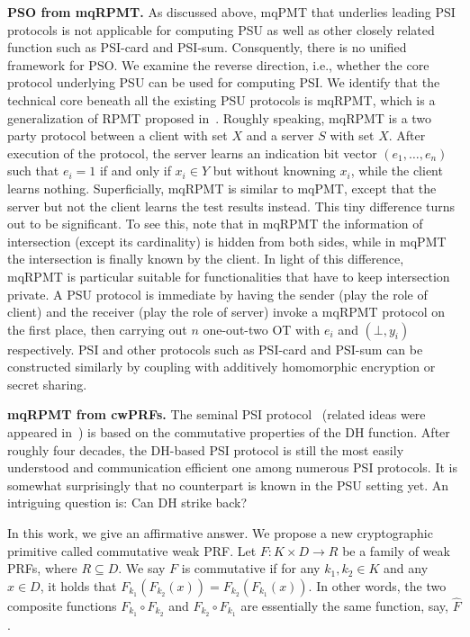 \documentclass[a4paper,10pt]{article}
\begin{document}
\begin{trivlist}
\item \textbf{PSO from mqRPMT.} As discussed above, 
    mqPMT that underlies leading PSI protocols is not applicable for computing PSU as well as other closely related function 
    such as PSI-card and PSI-sum. 
    Consquently, there is no unified framework for PSO.  
    We examine the reverse direction, i.e., whether the core protocol underlying PSU can be used for computing PSI. 
    We identify that the technical core beneath all the existing PSU protocols is mqRPMT, 
    which is a generalization of RPMT proposed in~\cite{KRTW-ASIACRYPT-2019}. 
    Roughly speaking, mqRPMT is a two party protocol between a client with set $X$ and 
    a server $S$ with set $X$. 
    After execution of the protocol, the server learns an indication bit vector $(e_1, \dots, e_n)$ 
    such that $e_i = 1$ if and only if $x_i \in Y$ but without knowning $x_i$, while the client learns nothing. 
    Superficially, mqRPMT is similar to mqPMT, 
    except that the server but not the client learns the test results instead.  
    This tiny difference turns out to be significant. 
    To see this, note that in mqRPMT the information of intersection (except its cardinality) is hidden from both sides, 
    while in mqPMT the intersection is finally known by the client. 
    In light of this difference, mqRPMT is particular suitable for functionalities that have to keep intersection private. 
    A PSU protocol is immediate by having the sender (play the role of client) and the receiver (play the role of server) 
    invoke a mqRPMT protocol on the first place, 
    then carrying out $n$ one-out-two OT with $e_i$ and $(\bot, y_i)$ respectively. 
    PSI and other protocols such as PSI-card and PSI-sum can be constructed similarly 
    by coupling with additively homomorphic encryption or secret sharing. 

\item \textbf{mqRPMT from cwPRFs.} The seminal PSI protocol~\cite{Meadows-SP-1986} 
    (related ideas were appeared in~\cite{Shamir-ICALP-1980, HFH-EC-1999}) 
    is based on the commutative properties of the DH function. 
    After roughly four decades, 
    the DH-based PSI protocol is still the most easily understood and communication efficient one 
    among numerous PSI protocols. It is somewhat surprisingly that no counterpart is known in the PSU setting yet.  
    An intriguing question is: Can DH strike back?

    In this work, we give an affirmative answer. 
    We propose a new cryptographic primitive called commutative weak PRF. 
    Let $F: K \times D \rightarrow R$ be a family of weak PRFs, where $R \subseteq D$. 
    We say $F$ is commutative if for any $k_1, k_2 \in K$ and any $x \in D$, 
    it holds that $F_{k_1}(F_{k_2}(x)) = F_{k_2}(F_{k_1}(x))$. 
    In other words, the two composite functions $F_{k_1} \circ F_{k_2}$ and $F_{k_2} \circ F_{k_1}$ 
    are essentially the same function, say, $\hat{F}$.    


\end{trivlist}
\end{document}
